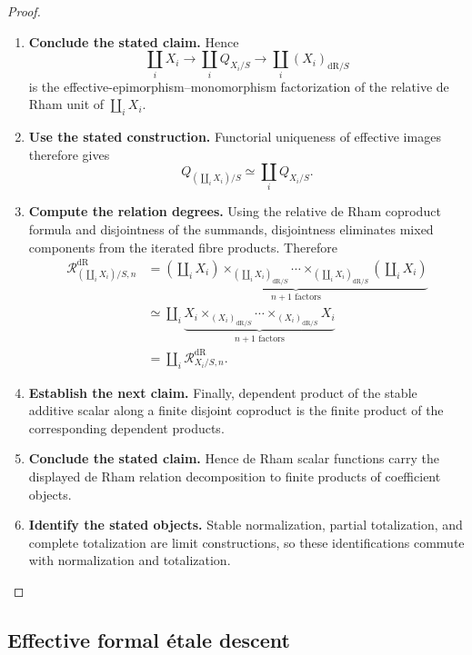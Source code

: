 \begin{proof}
\begin{enumerate}[label=\textup{(\arabic*)}]
    By disjointness and universality of finite coproducts, the
    coproduct of the monomorphisms \(m_i\) is again a monomorphism.
    \item \textbf{Conclude the stated claim.}
    Hence
    \[
    \coprod_iX_i
    \longrightarrow
    \coprod_iQ_{X_i/S}
    \longrightarrow
    \coprod_i(X_i)_{\mathrm{dR}/S}
    \]
    is the effective-epimorphism--monomorphism factorization of the relative de Rham
    unit of \(\coprod_iX_i\).
    \item \textbf{Use the stated construction.}
    Functorial uniqueness of effective images therefore gives
    \[
    Q_{(\coprod_iX_i)/S}
    \simeq
    \coprod_iQ_{X_i/S}.
    \]
    \item \textbf{Compute the relation degrees.}
    Using the relative de Rham coproduct formula and disjointness of the summands,
    disjointness eliminates mixed components from the iterated fibre products. Therefore
    \[
    \begin{aligned}
    \mathcal R^{\mathrm{dR}}_{(\coprod_iX_i)/S,n}
    &=
    \underbrace{
    \left(\coprod_iX_i\right)
    \times_{(\coprod_iX_i)_{\mathrm{dR}/S}}
    \cdots
    \times_{(\coprod_iX_i)_{\mathrm{dR}/S}}
    \left(\coprod_iX_i\right)
    }_{n+1\text{ factors}}
    \\
    &\simeq
    \coprod_i
    \underbrace{
    X_i\times_{(X_i)_{\mathrm{dR}/S}}
    \cdots
    \times_{(X_i)_{\mathrm{dR}/S}}X_i
    }_{n+1\text{ factors}}
    \\
    &=
    \coprod_i\mathcal R^{\mathrm{dR}}_{X_i/S,n}.
    \end{aligned}
    \]
    \item \textbf{Establish the next claim.}
    Finally, dependent product of the stable additive scalar along a finite disjoint
    coproduct is the finite product of the corresponding dependent products.
    \item \textbf{Conclude the stated claim.}
    Hence
    de Rham scalar functions carry the displayed de Rham relation decomposition to finite
    products of coefficient objects.
    \item \textbf{Identify the stated objects.}
    Stable normalization, partial totalization, and
    complete totalization are limit constructions, so these identifications commute
    with normalization and totalization.
\end{enumerate}
\end{proof}

\subsection{Effective formal \texorpdfstring{\'etale}{etale} descent}
\label{subsec:effective-formally-etale-descent}

